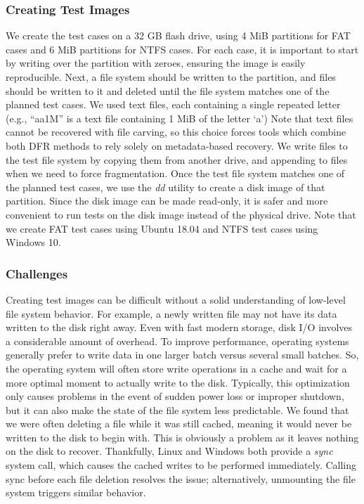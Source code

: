 \subsubsection{Creating Test Images}

We create the test cases on a 32 GB flash drive, using 4 MiB partitions for FAT cases and 6 MiB partitions for NTFS cases.
For each case, it is important to start by writing over the partition with zeroes, ensuring the image is easily reproducible.
Next, a file system should be written to the partition, and files should be written to it and deleted until the file system matches one of the planned test cases.
We used text files, each containing a single repeated letter (e.g., ``aa1M'' is a text file containing 1 MiB of the letter `a')
Note that text files cannot be recovered with file carving, so this choice forces tools which combine both DFR methods to rely solely on metadata-based recovery.
We write files to the test file system by copying them from another drive, and appending to files when we need to force fragmentation.
Once the test file system matches one of the planned test cases, we use the \emph{dd} utility to create a disk image of that partition.
Since the disk image can be made read-only, it is safer and more convenient to run tests on the disk image instead of the physical drive.
Note that we create FAT test cases using Ubuntu 18.04 and NTFS test cases using Windows 10.

\subsubsection{Challenges}

Creating test images can be difficult without a solid understanding of low-level file system behavior.
For example, a newly written file may not have its data written to the disk right away.
Even with fast modern storage, disk I/O involves a considerable amount of overhead.
To improve performance, operating systems generally prefer to write data in one larger batch versus several small batches.
So, the operating system will often store write operations in a cache and wait for a more optimal moment to actually write to the disk.
Typically, this optimization only causes problems in the event of sudden power loss or improper shutdown, but it can also make the state of the file system less predictable.
We found that we were often deleting a file while it was still cached, meaning it would never be written to the disk to begin with.
This is obviously a problem as it leaves nothing on the disk to recover.
Thankfully, Linux and Windows both provide a \emph{sync} system call, which causes the cached writes to be performed immediately.
Calling sync before each file deletion resolves the issue; alternatively, unmounting the file system triggers similar behavior.

